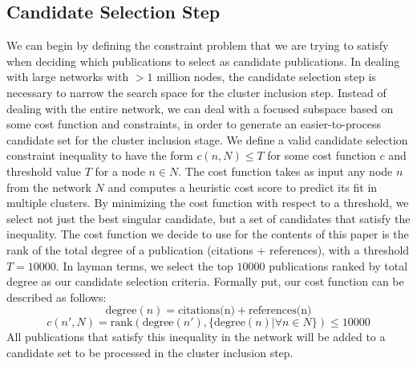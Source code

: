\documentclass{article}
\begin{document}
\subsection{Candidate Selection Step}
We can begin by defining the constraint problem that we are trying to satisfy when deciding which publications to select as candidate publications. In dealing with large networks with $>1$ million nodes, the candidate selection step is necessary to narrow the search space for the cluster inclusion step. Instead of dealing with the entire network, we can deal with a focused subspace based on some cost function and constraints, in order to generate an easier-to-process candidate set for the cluster inclusion stage.
\newline\newline
We define a valid candidate selection constraint inequality to have the form $c(n, N) \leq T$ for some cost function $c$ and threshold value $T$ for a node $n \in N$. The cost function takes as input any node $n$ from the network $N$ and computes a heuristic cost score to predict its fit in multiple clusters. By minimizing the cost function with respect to a threshold, we select not just the best singular candidate, but a set of candidates that satisfy the inequality. 
\newline\newline
The cost function we decide to use for the contents of this paper is the rank of the total degree of a publication (citations + references), with a threshold $T=10000$. In layman terms, we select the top $10000$ publications ranked by total degree as our candidate selection criteria. Formally put, our cost function can be described as follows:
$$\text{degree}(n) = \text{citations(n)} + \text{references(n)}$$
$$c(n', N) = \text{rank}(\text{degree}(n'), \{\text{degree}(n) | \forall n \in N\}) \leq 10000$$
All publications that satisfy this inequality in the network will be added to a candidate set to be processed in the cluster inclusion step. 
\end{document}
